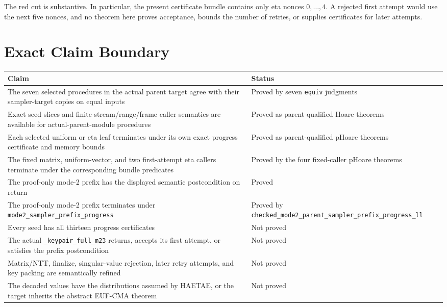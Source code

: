\documentclass[11pt]{article}
\theoremstyle{definition}
\theoremstyle{plain}
\theoremstyle{remark}
\newcommand{\code}[1]{\nolinkurl{#1}}
\begin{document}
The red cut is substantive.  In particular, the present certificate bundle
contains only eta nonces \(0,\ldots,4\).  A rejected first attempt would use
the next five nonces, and no theorem here proves acceptance, bounds the number
of retries, or supplies certificates for later attempts.

\section{Exact Claim Boundary}

\begin{center}
\begin{tabularx}{\textwidth}{>{\raggedright\arraybackslash}p{}X}
\toprule
Claim & Status\\
\midrule
The seven selected procedures in the actual parent target agree with their
sampler-target copies on equal inputs &
Proved by seven \code{equiv} judgments\\
Exact seed slices and finite-stream/range/frame caller semantics are available
for actual-parent-module procedures &
Proved as parent-qualified Hoare theorems\\
Each selected uniform or eta leaf terminates under its own exact progress
certificate and memory bounds &
Proved as parent-qualified pHoare theorems\\
The fixed matrix, uniform-vector, and two first-attempt eta callers terminate
under the corresponding bundle predicates &
Proved by the four fixed-caller pHoare theorems\\
The proof-only mode-2 prefix has the displayed semantic postcondition on
return &
Proved\\
The proof-only mode-2 prefix terminates under
\code{mode2_sampler_prefix_progress} &
Proved by \code{checked_mode2_parent_sampler_prefix_progress_ll}\\
Every seed has all thirteen progress certificates &
Not proved\\
The actual \code{_keypair_full_m23} returns, accepts its first attempt, or
satisfies the prefix postcondition &
Not proved\\
Matrix/NTT, finalize, singular-value rejection, later retry attempts, and key
packing are semantically refined &
Not proved\\
The decoded values have the distributions assumed by HAETAE, or the target
inherits the abstract EUF-CMA theorem &
Not proved\\
\bottomrule
\end{tabularx}
\end{center}
\end{document}
